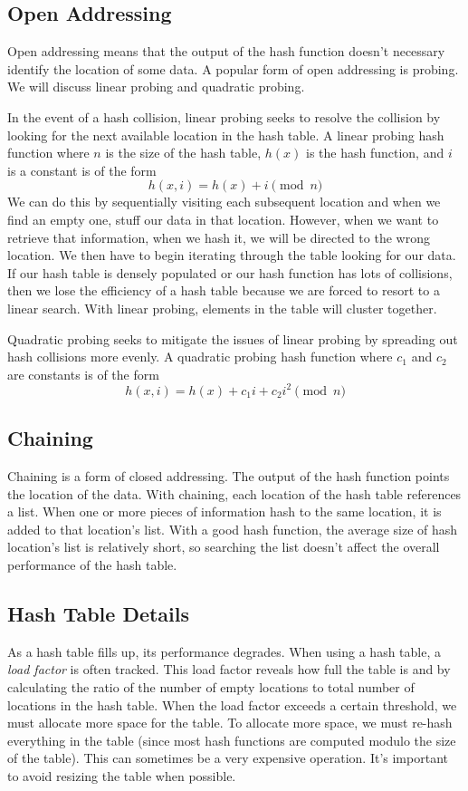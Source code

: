 \subsection*{Open Addressing}
Open addressing means that the output of the hash function doesn't necessary identify the location of some data.
A popular form of open addressing is probing. 
We will discuss linear probing and quadratic probing.

In the event of a hash collision, linear probing seeks to resolve the collision by looking for the next available location in the hash table.
A linear probing hash function where $n$ is the size of the hash table, $h(x)$ is the hash function, and $i$ is a constant is of the form
\begin{equation*}
h(x, i) = h(x) + i \pmod{n}
\end{equation*}
We can do this by sequentially visiting each subsequent location and when we find an empty one, stuff our data in that location.  
However, when we want to retrieve that information, when we hash it, we will be directed to the wrong location. 
We then have to begin iterating through the table looking for our data.
If our hash table is densely populated or our hash function has lots of collisions, 
then we lose the efficiency of a hash table because we are forced to resort to a linear search.
With linear probing, elements in the table will cluster together.

Quadratic probing seeks to mitigate the issues of linear probing by spreading out hash collisions more evenly.   
A quadratic probing hash function where $c_1$ and $c_2$ are constants is of the form
\begin{equation*}
h(x, i) = h(x) + c_1i + c_2i^2 \pmod{n}
\end{equation*}

\subsection*{Chaining}
Chaining is a form of closed addressing.  The output of the hash function points the location of the data. 
With chaining, each location of the hash table references a list.
When one or more pieces of information hash to the same location, it is added to that location's list.  
With a good hash function, the average size of hash location's list is relatively short,
so searching the list doesn't affect the overall performance of the hash table.

\subsection*{Hash Table Details}
As a hash table fills up, its performance degrades.
When using a hash table, a \emph{load factor} is often tracked.
This load factor reveals how full the table is and by calculating the ratio of the number of empty locations to total number of locations in the hash table.
When the load factor exceeds a certain threshold, we must allocate more space for the table.
To allocate more space, we must re-hash everything in the table (since most hash functions are computed modulo the size of the table).
This can sometimes be a very expensive operation.
It's important to avoid resizing the table when possible.

